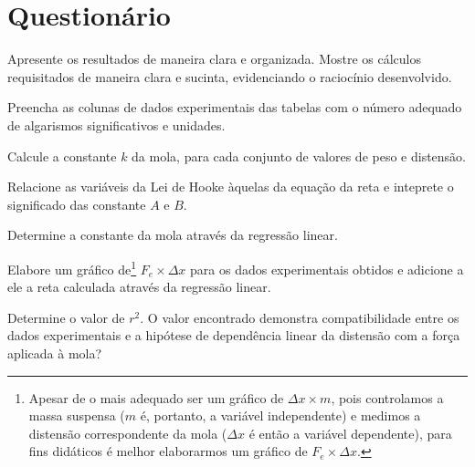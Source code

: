 \section{Questionário}

\begin{question}[type={exam}]{1}
Apresente os resultados de maneira clara e organizada. Mostre os cálculos requisitados de maneira clara e sucinta, evidenciando o raciocínio desenvolvido.
\end{question}

\begin{question}[type={exam}]{2}
Preencha as colunas de dados experimentais das tabelas com o número adequado de algarismos significativos e unidades.
\end{question}

\begin{question}[type={exam}]{1} 
Calcule a constante $k$ da mola, para cada conjunto de valores de peso e distensão.
\end{question}

\begin{question}[type={exam}]{1} 
Relacione as variáveis da Lei de Hooke àquelas da equação da reta e inteprete o significado das constante $A$ e $B$.
\end{question}

\begin{question}[type={exam}]{2} 
Determine a constante da mola através da regressão linear.
\end{question}

\begin{question}[type={exam}]{2} 
Elabore um gráfico de\footnote{Apesar de o mais adequado ser um gráfico de $\Delta x \times m$, pois controlamos a massa suspensa ($m$ é, portanto, a variável independente) e medimos a distensão correspondente da mola ($\Delta x$ é então a variável dependente), para fins didáticos é melhor elaborarmos um gráfico de  $F_e \times \Delta x$.} $F_e \times \Delta x$ para os dados experimentais obtidos e adicione a ele a reta calculada através da regressão linear.
\end{question}

\begin{question}[type={exam}]{1} 
Determine o valor de $r^2$. O valor encontrado demonstra compatibilidade entre os dados experimentais e a hipótese de dependência linear da distensão com a força aplicada à mola?
\end{question}
\vfill

